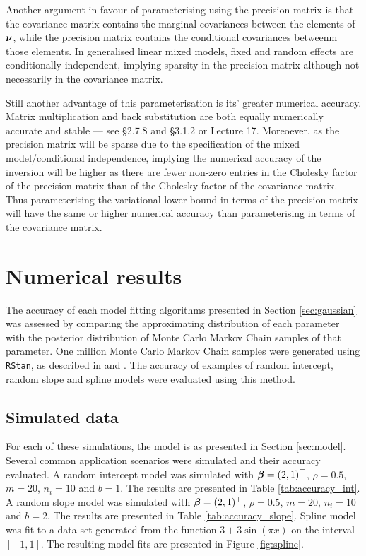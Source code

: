 Another argument in favour of parameterising using the precision matrix is that
the covariance matrix contains the marginal covariances between the elements of
${\boldsymbol \nu}$, while the precision matrix contains the conditional covariances
betweenm those elements. In generalised linear mixed models, fixed and random
effects are conditionally independent, implying sparsity in the precision
matrix although not necessarily in the covariance matrix.

Still another advantage of this parameterisation is its' greater numerical
accuracy.  Matrix multiplication and back substitution are both equally
numerically accurate and stable --- see \cite{Golub:1996:MC:248979} \S2.7.8 and
\S3.1.2 or \cite{trefethen97} Lecture 17. Moreoever, as the precision matrix
will be sparse due to the specification of the mixed model/conditional
independence, implying the numerical accuracy of the inversion will be higher
as there are fewer non-zero entries in the Cholesky factor of the precision
matrix than of the Cholesky factor of the covariance matrix. Thus
parameterising the variational lower bound in terms of the precision matrix
will have the same or higher numerical accuracy than parameterising in terms of
the covariance matrix.

\section{Numerical results}
\label{sec:results}
The accuracy of each model fitting algorithms presented in Section
\ref{sec:gaussian} was assessed by comparing the approximating distribution of
each parameter with the posterior distribution of Monte Carlo Markov Chain
samples of that parameter. One million Monte Carlo Markov Chain samples were
generated using \texttt{RStan}, as described in \cite{Carpenter2016} and
\cite{StanDevelopmentTeam2016}. The accuracy of examples of random intercept,
random slope and spline models were evaluated using this method.
		
\subsection{Simulated data}
For each of these simulations, the model is as presented in Section
\ref{sec:model}. Several common application scenarios were simulated and their
accuracy evaluated. A random intercept model was simulated with ${\boldsymbol \beta} = (2,
1)^\top$, $\rho = 0.5$, $m = 20$, $n_i = 10$ and $b = 1$. The results are
presented in Table \ref{tab:accuracy_int}. A random slope model was simulated
with ${\boldsymbol \beta} = (2, 1)^\top$, $\rho = 0.5$, $m = 20$, $n_i = 10$ and $b = 2$.
The results are presented in Table \ref{tab:accuracy_slope}. Spline model was
fit to a data set generated from the function $3 + 3 \sin{(\pi x)}$ on the
interval $[-1, 1]$. The resulting model fits are presented in Figure
\ref{fig:spline}.
		
